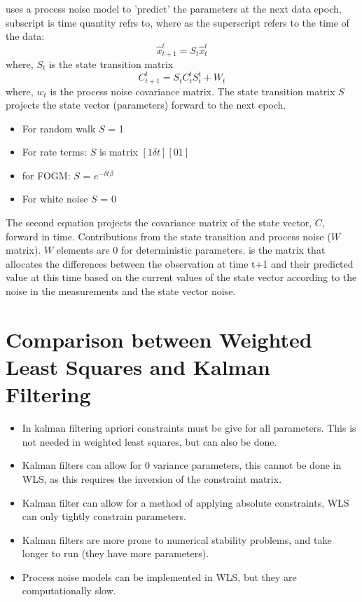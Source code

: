  {uses a process noise model} to 'predict' the parameters at the next data epoch, subscript is time quantity refrs to, where as the superscript refers to the time of the data:
\begin{equation}
    \hat{x}_{t+1}^t = S_t \hat{x}_t^t
\end{equation}
where, $S_t$ is the state transition matrix
\begin{equation}
    C_{t+1}^t = S_t C_t^t S_t^t + W_t
\end{equation}
where, $w_t$ is the process noise covariance matrix.
The state transition matrix $S$ projects the state vector (parameters) forward to the next epoch.
\begin{itemize}
    \item For random walk $S$ = 1
    \item For rate terms: $S$ is matrix $[1 \delta t][0 1]$
    \item for FOGM: $S$ = $e^{-\delta t \beta}$
    \item For white noise $S$ = 0
\end{itemize}
The second equation projects the covariance matrix of the state vector, $C$, forward in time. Contributions from the state transition and process noise ($W$ matrix). $W$ elements are 0 for deterministic parameters.
%
 {is the matrix} that allocates the differences between the observation at time t+1 and their predicted value at this time based on the current values of the state vector according to the noise in the measurements and the state vector noise.

\section{Comparison between Weighted Least Squares and Kalman Filtering}

\begin{itemize}
    \item In kalman filtering apriori constraints must be give for all parameters. This is not needed in weighted least squares, but can also be done.
    \item Kalman filters can allow for 0 variance parameters, this cannot be done in WLS, as this requires the inversion of the constraint matrix.
    \item Kalman filter can allow for a method of applying absolute constraints, WLS can only tightly constrain parameters.
    \item Kalman filters are more prone to numerical stability problems, and take longer to run (they have more parameters).
    \item Process noise models can be implemented in WLS, but they are computationally slow.
\end{itemize}

